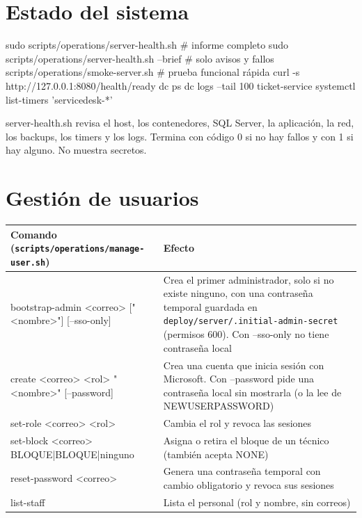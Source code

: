 \documentclass[11pt,a4paper,oneside]{report}
\newcommand{\codus}{\textunderscore\allowbreak}
\DeclareRobustCommand{\cod}[1]{{\small\ttfamily\let\_\codus #1}}
\DeclareRobustCommand{\ruta}[1]{{\small\nolinkurl{#1}}}
\newcommand{\cabecera}{\rowcolor{utaRojo!12}}
\begin{document}
\section{Estado del sistema}
\begin{bash}
sudo scripts/operations/server-health.sh          # informe completo
sudo scripts/operations/server-health.sh --brief  # solo avisos y fallos
scripts/operations/smoke-server.sh                # prueba funcional rápida
curl -s http://127.0.0.1:8080/health/ready
dc ps
dc logs --tail 100 ticket-service
systemctl list-timers 'servicedesk-*'
\end{bash}

\cod{server-health.sh} revisa el host, los contenedores, SQL Server, la aplicación, la red, los backups,
los timers y los logs. Termina con código 0 si no hay fallos y con 1 si hay alguno. No muestra secretos.

\section{Gestión de usuarios}
\begin{longtable}{@{}P{6.6cm}p{8.0cm}@{}}
\toprule
\cabecera \textbf{Comando} (\ruta{scripts/operations/manage-user.sh}) & \textbf{Efecto} \\
\midrule
\endhead
\cod{bootstrap-admin <correo> ["<nombre>"] [--sso-only]} & Crea el primer administrador, solo si no existe ninguno, con una contraseña temporal guardada en \ruta{deploy/server/.initial-admin-secret} (permisos 600). Con \cod{--sso-only} no tiene contraseña local \\
\cod{create <correo> <rol> "<nombre>" [--password]} & Crea una cuenta que inicia sesión con Microsoft. Con \cod{--password} pide una contraseña local sin mostrarla (o la lee de \cod{NEW\_USER\_PASSWORD}) \\
\cod{set-role <correo> <rol>} & Cambia el rol y revoca las sesiones \\
\cod{set-block <correo> BLOQUE\_1|BLOQUE\_2|ninguno} & Asigna o retira el bloque de un técnico (también acepta \cod{NONE}) \\
\cod{reset-password <correo>} & Genera una contraseña temporal con cambio obligatorio y revoca sus sesiones \\
\cod{list-staff} & Lista el personal (rol y nombre, sin correos) \\
\bottomrule
\end{longtable}
\end{document}
